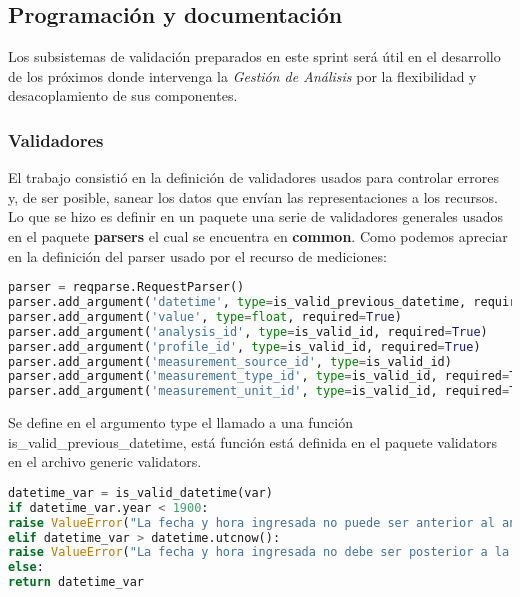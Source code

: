 \subsection{Programación y documentación}

Los subsistemas de validación preparados en este sprint será útil en el desarrollo de los próximos donde intervenga la \textit{Gestión de Análisis} por la flexibilidad y desacoplamiento de sus componentes.

\subsubsection{Validadores}
El trabajo consistió en la definición de validadores usados para controlar errores y, de ser posible, sanear los datos que envían las representaciones a los recursos. Lo que se hizo es definir en un paquete una serie de validadores generales usados en el paquete \textbf{parsers} el cual se encuentra en \textbf{common}. Como podemos apreciar en la definición del parser usado por el recurso de mediciones:

\begin{lstlisting}[language=Python]
parser = reqparse.RequestParser()
parser.add_argument('datetime', type=is_valid_previous_datetime, required=True)
parser.add_argument('value', type=float, required=True)
parser.add_argument('analysis_id', type=is_valid_id, required=True)
parser.add_argument('profile_id', type=is_valid_id, required=True)
parser.add_argument('measurement_source_id', type=is_valid_id)
parser.add_argument('measurement_type_id', type=is_valid_id, required=True)
parser.add_argument('measurement_unit_id', type=is_valid_id, required=True)
\end{lstlisting}

\begin{sloppypar}
	Se define en el argumento type el llamado a una función is\_valid\_previous\_datetime, está función está definida en el paquete validators en el archivo generic validators.
\end{sloppypar}


\begin{lstlisting}[language=Python]
datetime_var = is_valid_datetime(var)
if datetime_var.year < 1900:
raise ValueError("La fecha y hora ingresada no puede ser anterior al anio 1900.")
elif datetime_var > datetime.utcnow():
raise ValueError("La fecha y hora ingresada no debe ser posterior a la fecha y hora actual.")
else:
return datetime_var
\end{lstlisting}

